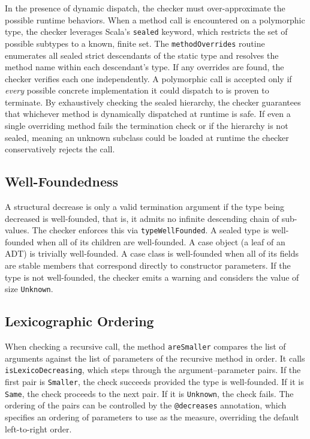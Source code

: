 In the presence of dynamic dispatch, the checker must over-approximate the
possible runtime behaviors. When a method call is encountered on a polymorphic
type, the checker leverages Scala's \texttt{sealed} keyword, which restricts the
set of possible subtypes to a known, finite set. The
\texttt{methodOverrides} routine enumerates all sealed strict descendants of the
static type and resolves the method name within each descendant's type. If any
overrides are found, the checker verifies each one independently. A polymorphic
call is accepted only if \emph{every} possible concrete implementation it could
dispatch to is proven to terminate. By exhaustively checking the sealed
hierarchy, the checker guarantees that whichever method is dynamically
dispatched at runtime is safe. If even a single overriding method fails the
termination check or if the hierarchy is not sealed, meaning an unknown subclass
could be loaded at runtime the checker conservatively rejects the call.

\subsection{Well-Foundedness}
A structural decrease is only a valid termination argument if the type being
decreased is well-founded, that is, it admits no infinite descending chain of
sub-values. The checker enforces this via \texttt{typeWellFounded}. A sealed
type is well-founded when all of its children are well-founded. A case object
(a leaf of an ADT) is trivially well-founded. A case class is well-founded
when all of its fields are stable members that correspond directly to
constructor parameters. If the type is not well-founded, the checker emits a
warning and considers the value of size \texttt{Unknown}.

\subsection{Lexicographic Ordering}
When checking a recursive call, the method \texttt{areSmaller} compares the list
of arguments against the list of parameters of the recursive method in order. It
calls \texttt{isLexicoDecreasing}, which steps through the argument–parameter
pairs. If the first pair is \texttt{Smaller}, the check succeeds provided the
type is well-founded. If it is \texttt{Same}, the check proceeds to the next
pair. If it is \texttt{Unknown}, the check fails. The ordering of the pairs can
be controlled by the \texttt{@decreases} annotation, which specifies an ordering
of parameters to use as the measure, overriding the default left-to-right order.


